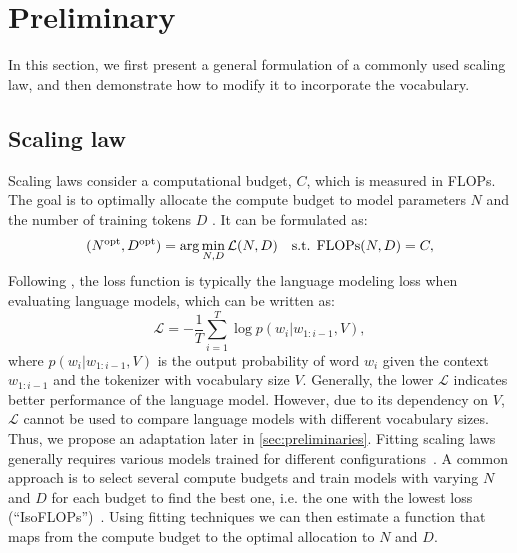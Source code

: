 
\section{Preliminary}

In this section, we first present a general formulation of a commonly used scaling law, and then demonstrate how to modify it to incorporate the vocabulary.

\subsection{Scaling law}

Scaling laws consider a computational budget, $C$, which is measured in FLOPs. The goal is to optimally allocate the compute budget to model parameters $N$ and the number of training tokens $D$ \citep{kaplan2020scaling,bahri2021explaining,hoffmann2022training,muennighoff2024scaling}. It can be formulated as:
\begin{equation}
    (N^{\rm opt}, D^{\rm opt}) = \arg\min_{N,D} \mathcal{L}(N,D) \quad \text{s.t. FLOPs}(N,D) = C,
\end{equation}
Following \citet{radford2018improving}, the loss function is typically the language modeling loss when evaluating language models, which can be written as:
\begin{equation}
 \mathcal{L}= -\frac{1}{T} \sum_{i=1}^{T} \log p(w_i | w_{1:i-1},V),
 \label{eq:lm_loss}
\end{equation}
where $p(w_i | w_{1:i-1},V)$ is the output probability of word $w_i$ given the context $w_{1:i-1}$ and the tokenizer with vocabulary size $V$.
Generally, the lower $\mathcal{L}$ indicates better performance of the language model.
However, due to its dependency on $V$, $\mathcal{L}$ cannot be used to compare language models with different vocabulary sizes. Thus, we propose an adaptation later in \autoref{sec:preliminaries}. Fitting scaling laws generally requires various models trained for different configurations~\citep{gadre2024language}. A common approach is to select several compute budgets and train models with varying $N$ and $D$ for each budget to find the best one, i.e. the one with the lowest loss (``IsoFLOPs'')~\citep{hoffmann2022training}. Using fitting techniques we can then estimate a function that maps from the compute budget to the optimal allocation to $N$ and $D$.



